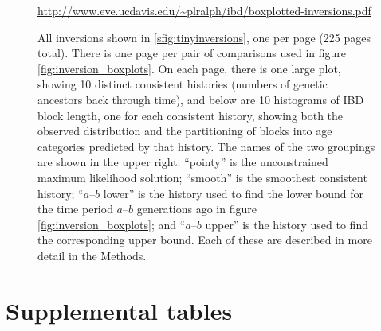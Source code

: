 \documentclass{article}
\begin{document}
\begin{figure}[!htp]
  \begin{center}
    
    \vspace{2em}
    \begin{center}
      \url{http://www.eve.ucdavis.edu/~plralph/ibd/boxplotted-inversions.pdf}
    \end{center}
    \vspace{2em}
    \caption{
    All inversions shown in \ref{sfig:tinyinversions}, one per page (225 pages total).
    There is one page per pair of comparisons used in figure \ref{fig:inversion_boxplots}.
    On each page, there is one large plot, showing 10 distinct consistent histories (numbers of genetic ancestors back through time),
    and below are 10 histograms of IBD block length, one for each consistent history,
    showing both the observed distribution
    and the partitioning of blocks into age categories predicted by that history.
    The names of the two groupings are shown in the upper right:
    ``pointy'' is the unconstrained maximum likelihood solution;
    ``smooth'' is the smoothest consistent history;
    ``$a$--$b$ lower'' is the history used to find the lower bound for the time period $a$--$b$ generations ago in figure \ref{fig:inversion_boxplots};
    and ``$a$--$b$ upper'' is the history used to find the corresponding upper bound.
    Each of these are described in more detail in the Methods.
    \label{sfig:all_inversions}
    }
  \end{center}
\end{figure}

\clearpage

\section*{Supplemental tables}
\end{document}
